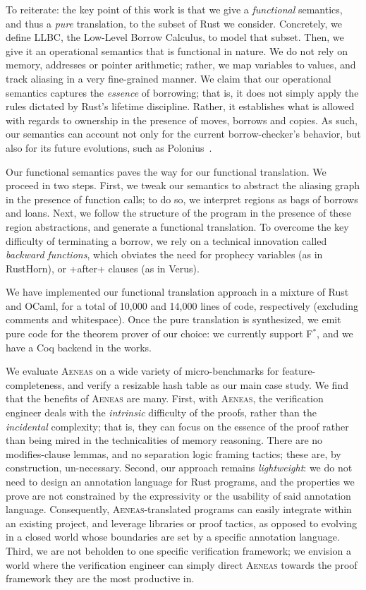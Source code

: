 \documentclass[acmsmall,screen]{acmart}
\newcommand{\aeneas}{\textsc{Aeneas}\xspace}
\newcommand{\fstar}{F$^\ast$\xspace}
\begin{document}
To reiterate: the key point of this work is that we give a \emph{functional}
semantics, and thus a \emph{pure} translation, to the subset of Rust we
consider. Concretely, we define LLBC, the Low-Level Borrow Calculus, to
model that subset. Then, we give it an operational semantics that is
functional in nature. We do not rely on memory, addresses or pointer arithmetic;
rather, we map variables to values, and track aliasing in a very fine-grained
manner. We claim that our operational semantics captures the \emph{essence} of
borrowing; that is, it does not simply apply the rules dictated by Rust's
lifetime discipline. Rather, it establishes what is allowed with regards to ownership in the
presence of moves, borrows and copies. As such, our semantics can account not
only for the current borrow-checker's behavior, but also for its future
evolutions, such as Polonius~\cite{polonius}.

Our functional semantics paves the way for our functional translation. We
proceed in two steps. First, we tweak our semantics to abstract the
aliasing graph in the presence of function calls; to do so, we interpret
regions as bags of borrows and loans. Next, we follow the structure of the
program in the presence of these region abstractions, and generate a functional
translation. To overcome the key difficulty of terminating a borrow, we rely on
a technical innovation called \emph{backward functions}, which obviates the need
for prophecy variables (as in RustHorn), or \li+after+ clauses (as in Verus).

We have implemented our functional translation approach in a mixture of Rust and
OCaml, for a total of 10,000 and 14,000 lines of code, respectively (excluding
comments and whitespace). Once the pure translation is synthesized, we emit pure code for the
theorem prover of our choice: we currently support \fstar, and we have a Coq
backend in the works.

We evaluate \aeneas on a wide variety of micro-benchmarks for
feature-completeness, and verify a resizable hash table as our main
case study.
We find that the benefits of \aeneas are many. First,
with \aeneas, the verification engineer deals with the
\emph{intrinsic} difficulty of the proofs, rather than the \emph{incidental}
complexity; that is, they can focus on the essence of the proof rather than
being mired in the technicalities of memory reasoning. There are no
modifies-clause lemmas, and no separation logic framing tactics; these are,
by construction, un-necessary.
Second, our approach remains \emph{lightweight}: we do not need to design an
annotation language for Rust programs, and the properties we prove are not
constrained by the expressivity or the usability of said annotation language.
Consequently, \aeneas-translated programs can easily integrate within an
existing project, and leverage libraries or proof tactics, as opposed to
evolving in a closed world whose boundaries are set by a specific annotation
language.
Third, we are not beholden to one specific verification framework; we envision a
world where the verification engineer can simply direct \aeneas towards the
proof framework they are the most productive in.
\end{document}

